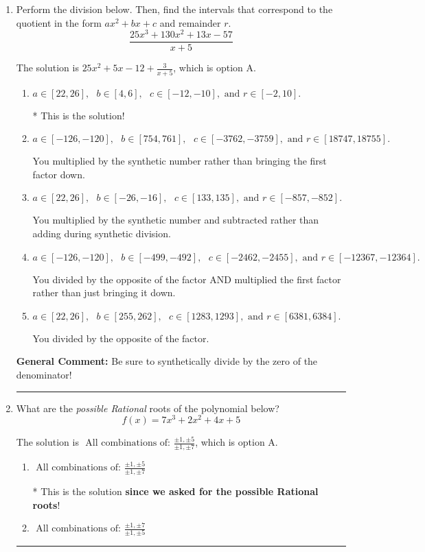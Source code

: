 \documentclass{extbook}[14pt]
\newcommand{\litem}[1]{\item #1

\rule{\textwidth}{0.4pt}}
\begin{document}
\begin{enumerate}\litem{
Perform the division below. Then, find the intervals that correspond to the quotient in the form $ax^2+bx+c$ and remainder $r$.
\[ \frac{25x^{3} +130 x^{2} +13 x -57}{x + 5} \]

The solution is \( 25x^{2} +5 x -12 + \frac{3}{x + 5} \), which is option A.\begin{enumerate}[label=\Alph*.]
\item \( a \in [22, 26], \text{   } b \in [4, 6], \text{   } c \in [-12, -10], \text{   and   } r \in [-2, 10]. \)

* This is the solution!
\item \( a \in [-126, -120], \text{   } b \in [754, 761], \text{   } c \in [-3762, -3759], \text{   and   } r \in [18747, 18755]. \)

 You multiplied by the synthetic number rather than bringing the first factor down.
\item \( a \in [22, 26], \text{   } b \in [-26, -16], \text{   } c \in [133, 135], \text{   and   } r \in [-857, -852]. \)

 You multiplied by the synthetic number and subtracted rather than adding during synthetic division.
\item \( a \in [-126, -120], \text{   } b \in [-499, -492], \text{   } c \in [-2462, -2455], \text{   and   } r \in [-12367, -12364]. \)

 You divided by the opposite of the factor AND multiplied the first factor rather than just bringing it down.
\item \( a \in [22, 26], \text{   } b \in [255, 262], \text{   } c \in [1283, 1293], \text{   and   } r \in [6381, 6384]. \)

 You divided by the opposite of the factor.
\end{enumerate}

\textbf{General Comment:} Be sure to synthetically divide by the zero of the denominator!
}
\litem{
What are the \textit{possible Rational} roots of the polynomial below?
\[ f(x) = 7x^{3} +2 x^{2} +4 x + 5 \]

The solution is \( \text{ All combinations of: }\frac{\pm 1,\pm 5}{\pm 1,\pm 7} \), which is option A.\begin{enumerate}[label=\Alph*.]
\item \( \text{ All combinations of: }\frac{\pm 1,\pm 5}{\pm 1,\pm 7} \)

* This is the solution \textbf{since we asked for the possible Rational roots}!
\item \( \text{ All combinations of: }\frac{\pm 1,\pm 7}{\pm 1,\pm 5} \)


\end{enumerate}}
\end{enumerate}
\end{document}
